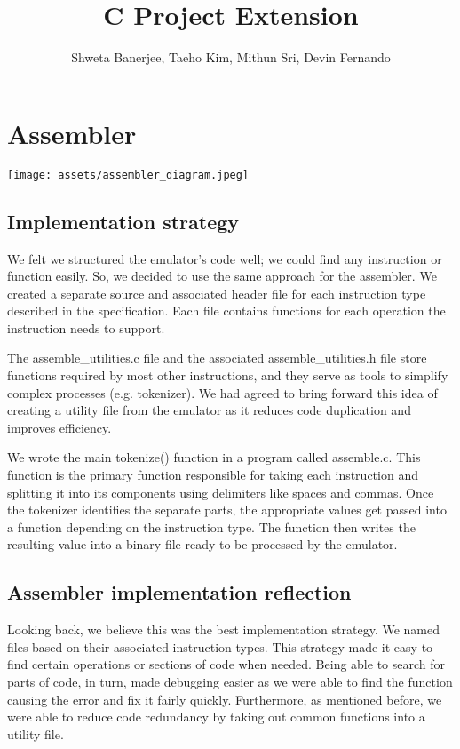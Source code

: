 \documentclass[11pt]{article}
\begin{document}
\title{C Project Extension}
\author{Shweta Banerjee, Taeho Kim, Mithun Sri, Devin Fernando}

\maketitle

\section{Assembler}
\begin{center}
    \texttt{[image: assets/assembler\_diagram.jpeg]}
\end{center}
\subsection{Implementation strategy}
We felt we structured the emulator's code well; we could find any instruction or function easily. So, we decided to use the same approach for the assembler. We created a separate source and associated header file for each instruction type described in the specification. Each file contains functions for each operation the instruction needs to support. 

The assemble\_utilities.c file and the associated assemble\_utilities.h file store functions required by most other instructions, and they serve as tools to simplify complex processes (e.g. tokenizer). We had agreed to bring forward this idea of creating a utility file from the emulator as it reduces code duplication and improves efficiency. 

We wrote the main tokenize() function in a program called assemble.c. This function is the primary function responsible for taking each instruction and splitting it into its components using delimiters like spaces and commas. Once the tokenizer identifies the separate parts, the appropriate values get passed into a function depending on the instruction type. The function then writes the resulting value into a binary file ready to be processed by the emulator. 

\subsection{Assembler implementation reflection}
Looking back, we believe this was the best implementation strategy. We named files based on their associated instruction types. This strategy made it easy to find certain operations or sections of code when needed. Being able to search for parts of code, in turn, made debugging easier as we were able to find the function causing the error and fix it fairly quickly. Furthermore, as mentioned before, we were able to reduce code redundancy by taking out common functions into a utility file.
\end{document}
